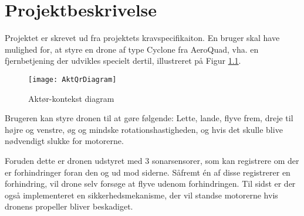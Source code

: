 \documentclass[Main]{subfiles}
\begin{document}
		
	

\chapter{Projektbeskrivelse}

Projektet er skrevet ud fra projektets kravspecifikaiton\cite{Kravspec}.
En bruger skal have mulighed for, at styre en drone af type Cyclone fra AeroQuad\cite{AQ-store}, vha. en fjernbetjening der udvikles specielt dertil, illustreret på Figur \ref{Fig:Aktor-oversigt}.

\begin{figure}[H]
\centering
\texttt{[image: AktQrDiagram]}
\caption{Aktør-kontekst diagram}
\label{Fig:Aktor-oversigt}
\end{figure}

Brugeren kan styre dronen til at gøre følgende: Lette, lande, flyve frem, dreje til højre og venstre, øg og mindske rotationshastigheden, og hvis det skulle blive nødvendigt slukke for motorerne.

Foruden dette er dronen udstyret med 3 sonarsensorer, som kan registrere om der er forhindringer foran den og ud mod siderne.
Såfremt én af disse registrerer en forhindring, vil drone selv forsøge at flyve udenom forhindringen.
Til sidst er der også implementeret en sikkerhedsmekanisme, der vil standse motorerne hvis dronens propeller bliver beskadiget.
\end{document}
